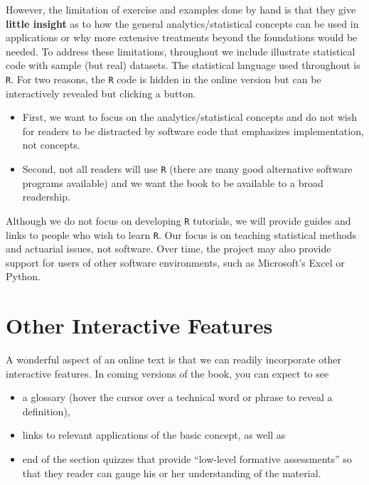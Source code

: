 \documentclass[]{book}
\providecommand{\tightlist}{%
  \setlength{\itemsep}{0pt}\setlength{\parskip}{0pt}}
\theoremstyle{definition}
\theoremstyle{definition}
\theoremstyle{definition}
\theoremstyle{remark}
\begin{document}
However, the limitation of exercise and examples done by hand is that
they give \textbf{little insight} as to how the general
analytics/statistical concepts can be used in applications or why more
extensive treatments beyond the foundations would be needed. To address
these limitations, throughout we include illustrate statistical code
with sample (but real) datasets. The statistical language used
throughout is \texttt{R}. For two reasons, the \texttt{R} code is hidden
in the online version but can be interactively revealed but clicking a
button.

\begin{itemize}
\tightlist
\item
  First, we want to focus on the analytics/statistical concepts and do
  not wish for readers to be distracted by software code that emphasizes
  implementation, not concepts.
\item
  Second, not all readers will use \texttt{R} (there are many good
  alternative software programs available) and we want the book to be
  available to a broad readership.
\end{itemize}

Although we do not focus on developing \texttt{R} tutorials, we will
provide guides and links to people who wish to learn \texttt{R}. Our
focus is on teaching statistical methods and actuarial issues, not
software. Over time, the project may also provide support for users of
other software environments, such as Microsoft's Excel or Python.

\section{Other Interactive Features}\label{other-interactive-features}

A wonderful aspect of an online text is that we can readily incorporate
other interactive features. In coming versions of the book, you can
expect to see

\begin{itemize}
\tightlist
\item
  a glossary (hover the cursor over a technical word or phrase to reveal
  a definition),
\item
  links to relevant applications of the basic concept, as well as
\item
  end of the section quizzes that provide ``low-level formative
  assessments'' so that they reader can gauge his or her understanding
  of the material.
\end{itemize}
\end{document}
